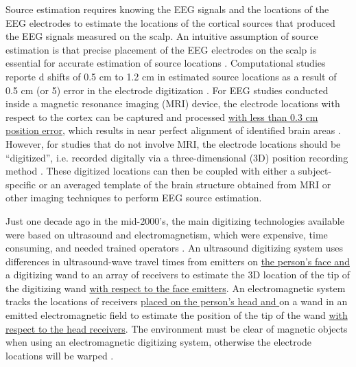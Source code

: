 \documentclass[../thesis_seyed.tex]{subfiles}
\begin{document}
Source estimation requires knowing the EEG signals and the locations of the EEG electrodes to estimate the locations of the cortical sources that produced the EEG signals measured on the scalp. An intuitive assumption of source estimation is that precise placement of the EEG electrodes on the scalp is essential for accurate estimation of source locations \cite{Keil2014-mv}. Computational studies reporte  d shifts of 0.5 cm to 1.2 cm in estimated source locations as a result of 0.5 cm (or 5\textdegree) error in the electrode digitization \cite{Kavanagk1978-zc,Khosla1999-bz,Wang2001-fp,Beltrachini2011-je,Akalin_Acar2013-rv}. For EEG studies conducted inside a magnetic resonance imaging (MRI) device, the electrode locations with respect to the cortex can be captured and processed \ul{with less than 0.3 cm position error}, which results in near perfect alignment of identified brain areas \cite{Marino2016-pu,Scarff2004-ll}. However, for studies that do not involve MRI, the electrode locations should be ``digitized'', i.e. recorded digitally via a three-dimensional (3D) position recording method \cite{Koessler2007-qg}. These digitized locations can then be coupled with either a subject-specific or an averaged template of the brain structure obtained from MRI or other imaging techniques to perform EEG source estimation.  

Just one decade ago in the mid-2000's, the main digitizing technologies available were based on ultrasound and electromagnetism, which were expensive, time consuming, and needed trained operators \cite{Koessler2007-qg,Rodriguez-Calvache2018-qi}. An ultrasound digitizing system uses differences in ultrasound-wave travel times from emitters on \ul{the person's face and} a digitizing wand to an array of receivers to estimate the 3D location of the tip of the digitizing wand \ul{with respect to the face emitters}. An electromagnetic system tracks the locations of receivers \ul{placed on the person's head and }on a wand in an emitted electromagnetic field to estimate the position of the tip of the wand \ul{with respect to the head receivers}. The environment must be clear of magnetic objects when using an electromagnetic digitizing system, otherwise the electrode locations will be warped  \cite{Engels2013-gm,Cline2018-qo}. 
\end{document}
